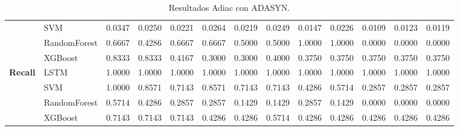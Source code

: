 \begin{table}[h]
\begin{adjustbox}{max width=15cm}
\begin{tabular}{|c|l|r|r|r|r|r|r|r|r|r|r|r|}
			& SVM &  0.0347 &  0.0250 &  0.0221 &  0.0264 &  0.0219 &  0.0249 &  0.0147 &  0.0226 &  0.0109 &  0.0123 &  0.0119 \\
			& RandomForest &  0.6667 &  0.4286 &  0.6667 &  0.6667 &  0.5000 &  0.5000 &  1.0000 &  1.0000 &  0.0000 &  0.0000 &  0.0000 \\
			& XGBoost &  0.8333 &  0.8333 &  0.4167 &  0.3000 &  0.3000 &  0.4000 &  0.3750 &  0.3750 &  0.3750 &  0.3750 &  0.3750 \\
			\hline
			\textbf{Recall} & LSTM &  1.0000 &  1.0000 &  1.0000 &  1.0000 &  1.0000 &  1.0000 &  1.0000 &  1.0000 &  1.0000 &  1.0000 &  1.0000 \\
			& SVM &  1.0000 &  0.8571 &  0.7143 &  0.8571 &  0.7143 &  0.7143 &  0.4286 &  0.5714 &  0.2857 &  0.2857 &  0.2857 \\
			& RandomForest &  0.5714 &  0.4286 &  0.2857 &  0.2857 &  0.1429 &  0.1429 &  0.2857 &  0.1429 &  0.0000 &  0.0000 &  0.0000 \\
			& XGBoost &  0.7143 &  0.7143 &  0.7143 &  0.4286 &  0.4286 &  0.5714 &  0.4286 &  0.4286 &  0.4286 &  0.4286 &  0.4286 \\
			\hline
		\end{tabular}
	\end{adjustbox}
	\caption{Resultados Adiac con ADASYN.}
	\label{tab:Adiac_ADASYN}
\end{table}
\newpage
